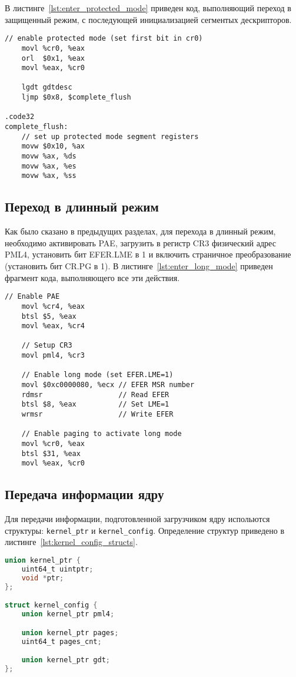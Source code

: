 В листинге~\ref{lst:enter_protected_mode} приведен код, выполняющий переход в защищенный режим,
с последующей инициализацией сегментых дескрипторов.
\begin{lstlisting}[language={[x86masm]Assembler},
caption={Переход в защищенный режим},label={lst:enter_protected_mode}]
	// enable protected mode (set first bit in cr0)
	movl %cr0, %eax
	orl  $0x1, %eax
	movl %eax, %cr0

	lgdt gdtdesc
	ljmp $0x8, $complete_flush

.code32
complete_flush:
	// set up protected mode segment registers
	movw $0x10, %ax
	movw %ax, %ds
	movw %ax, %es
	movw %ax, %ss
\end{lstlisting}

\subsection{Переход в длинный режим}
Как было сказано в предыдущих разделах, для перехода в длинный режим, необходимо
активировать PAE, загрузить в регистр CR3 физический адрес PML4, установить бит
EFER.LME в 1 и включить страничное преобразование (установить бит CR.PG в 1). В
листинге~\ref{lst:enter_long_mode} приведен фрагмент кода, выполняющего все эти действия.

\begin{lstlisting}[language={[x86masm]Assembler},
caption={Переход в длинный режим},label={lst:enter_long_mode}]
	// Enable PAE
	movl %cr4, %eax
	btsl $5, %eax
	movl %eax, %cr4

	// Setup CR3
	movl pml4, %cr3

	// Enable long mode (set EFER.LME=1)
	movl $0xc0000080, %ecx // EFER MSR number
	rdmsr                  // Read EFER
	btsl $8, %eax          // Set LME=1
	wrmsr                  // Write EFER

	// Enable paging to activate long mode
	movl %cr0, %eax
	btsl $31, %eax
	movl %eax, %cr0
\end{lstlisting}

\subsection{Передача информации ядру}
Для передачи информации, подготовленной загрузчиком ядру испольются структуры:
\texttt{kernel\_ptr} и \texttt{kernel\_config}. Определение структур приведено
в листинге~\ref{lst:kernel_config_structs}.

\begin{lstlisting}[language=C,
caption={Структуры для передачи информации ядру},
label={lst:kernel_config_structs}]
union kernel_ptr {
	uint64_t uintptr;
	void *ptr;
};

struct kernel_config {
	union kernel_ptr pml4;

	union kernel_ptr pages;
	uint64_t pages_cnt;

	union kernel_ptr gdt;
};
\end{lstlisting}


